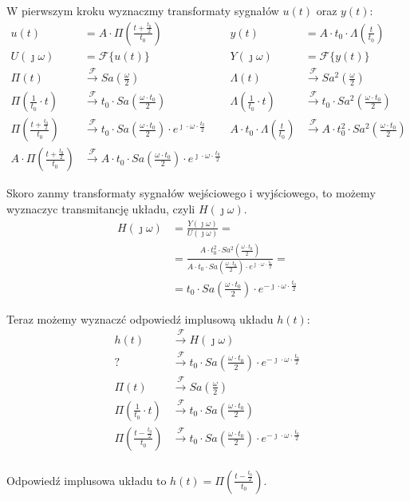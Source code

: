 \begin{task}
W pierwszym kroku wyznaczmy transformaty sygnałów $u(t)$ oraz $y(t)$:
\begin{align*}
u(t)&= A \cdot \Pi\left(\frac{t+\frac{t_0}{2}}{t_0}\right) & y(t)&= A \cdot t_0 \cdot \Lambda\left(\frac{t}{t_0}\right)\\
U(\jmath \omega)&=\mathcal F \{u(t)\} & Y(\jmath \omega)&=\mathcal F \{y(t)\} \\
\Pi(t) &\xrightarrow{\mathcal F} Sa\left(\frac{\omega}{2}\right) & \Lambda(t) &\xrightarrow{\mathcal F} Sa^2\left(\frac{\omega}{2}\right)\\
\Pi\left(\frac{1}{t_0} \cdot t \right) &\xrightarrow{\mathcal F} t_0 \cdot Sa\left(\frac{\omega \cdot t_0}{2}\right) & \Lambda\left(\frac{1}{t_0} \cdot t \right) &\xrightarrow{\mathcal F} t_0 \cdot Sa^2\left(\frac{\omega \cdot t_0}{2}\right)\\
\Pi\left(\frac{t+\frac{t_0}{2}}{t_0}\right) &\xrightarrow{\mathcal F} t_0 \cdot Sa\left(\frac{\omega \cdot t_0}{2}\right) \cdot e^{\jmath \cdot \omega \cdot \frac{t_0}{2}} & A \cdot t_0 \cdot \Lambda\left(\frac{t}{t_0}\right) &\xrightarrow{\mathcal F} A \cdot t_0^2 \cdot Sa^2\left(\frac{\omega \cdot t_0}{2}\right)\\
A \cdot \Pi\left(\frac{t+\frac{t_0}{2}}{t_0}\right) &\xrightarrow{\mathcal F} A \cdot t_0 \cdot Sa\left(\frac{\omega \cdot t_0}{2}\right) \cdot e^{\jmath \cdot \omega \cdot \frac{t_0}{2}} &  &
\end{align*}

Skoro zanmy transformaty sygnałów wejściowego i wyjściowego, to możemy wyznaczyc transmitancję układu, czyli $H(\jmath \omega)$. 
\begin{align*}
H(\jmath \omega)&=\frac{Y(\jmath \omega)}{U(\jmath \omega)}=\\
&=\frac{A \cdot t_0^2 \cdot Sa^2\left(\frac{\omega \cdot t_0}{2}\right)}{A \cdot t_0 \cdot Sa\left(\frac{\omega \cdot t_0}{2}\right) \cdot e^{\jmath \cdot \omega \cdot \frac{t_0}{2}}}=\\
&=t_0 \cdot Sa\left(\frac{\omega \cdot t_0}{2}\right) \cdot e^{-\jmath \cdot \omega \cdot \frac{t_0}{2}}
\end{align*}

Teraz możemy wyznaczć odpowied\'{z} implusową układu $h(t)$:
\begin{align*}
h(t) &\xrightarrow{\mathcal F} H(\jmath \omega)\\
? &\xrightarrow{\mathcal F} t_0 \cdot Sa\left(\frac{\omega \cdot t_0}{2}\right) \cdot e^{-\jmath \cdot \omega \cdot \frac{t_0}{2}}\\
\Pi(t) &\xrightarrow{\mathcal F} Sa\left(\frac{\omega}{2}\right)\\
\Pi\left(\frac{1}{t_0} \cdot t \right) &\xrightarrow{\mathcal F} t_0 \cdot Sa\left(\frac{\omega \cdot t_0}{2}\right)\\
\Pi\left(\frac{t-\frac{t_0}{2}}{t_0}\right) &\xrightarrow{\mathcal F} t_0 \cdot Sa\left(\frac{\omega \cdot t_0}{2}\right) \cdot e^{-\jmath \cdot \omega \cdot \frac{t_0}{2}}\\
\end{align*}


Odpowied\'{z} implusowa układu to $h(t)= \Pi\left(\frac{t-\frac{t_0}{2}}{t_0}\right)$.
\end{task}

